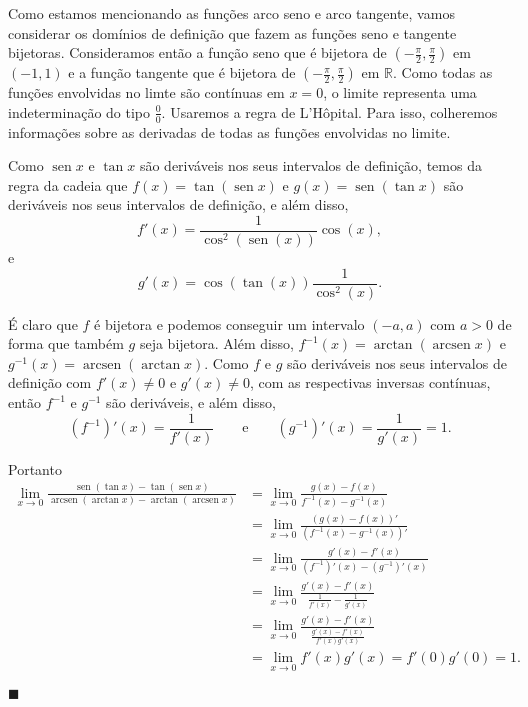 \documentclass[a4paper,11pt]{report}
\renewcommand{\baselinestretch}{1.3}   %
\DeclareMathOperator{\sen}{sen} %
\DeclareMathOperator{\arcsen}{arcsen}
\newenvironment{solucao}{ \vspace{.5\baselineskip} \renewcommand{\baselinestretch}{1}
                           \noindent {\bfseries Solução:} }
                        { \vspace{.5\baselineskip} \renewcommand{\baselinestretch}{1.2}
                           \hfill {\small $\blacksquare$} }
\begin{document}
\begin{solucao}
    Como estamos mencionando as funções arco seno e arco tangente, vamos considerar os domínios de
    definição que fazem as funções seno e tangente bijetoras. Consideramos então a função seno que
    é bijetora de $(-\frac{\pi}{2}, \frac{\pi}{2})$ em $(-1,1)$ e a função tangente que é bijetora
    de $(-\frac{\pi}{2}, \frac{\pi}{2})$ em $\mathbb{R}$. Como todas as funções envolvidas no
    limte são contínuas em $x = 0$, o limite representa uma indeterminação do tipo $\frac{0}{0}$.
    Usaremos a regra de L'Hôpital. Para isso, colheremos informações sobre as derivadas de todas
    as funções envolvidas no limite.

    Como $\sen x$ e $\tan x$ são deriváveis nos seus intervalos de definição, temos da regra da
    cadeia que $f(x) = \tan(\sen x)$ e $g(x) = \sen(\tan x)$ são deriváveis nos seus intervalos de
    definição, e além disso,
    $$ f'(x) = \frac{1}{\cos^{2}(\sen(x))} \cos(x), $$
    e
    $$ g'(x) = \cos(\tan(x)) \frac{1}{\cos^{2}(x)}. $$

    É claro que $f$ é bijetora e podemos conseguir um intervalo $(-a,a)$ com $a > 0$ de forma que
    também $g$ seja bijetora. Além disso, $f^{-1}(x) = \arctan(\arcsen x)$ e $g^{-1}(x) =
        \arcsen(\arctan x)$. Como $f$ e $g$ são deriváveis nos seus intervalos de definição com $f'(x)
        \neq 0$ e $g'(x) \neq 0$, com as respectivas inversas contínuas, então $f^{-1}$ e $g^{-1}$ são
    deriváveis, e além disso,
    $$ (f^{-1})'(x) = \frac{1}{f'(x)} \qquad \text{e} \qquad (g^{-1})'(x) = \frac{1}{g'(x)} = 1. $$

    Portanto
    \begin{align*}
        \lim_{x \to 0} \frac{\sen(\tan x) - \tan(\sen x)}{\arcsen(\arctan x) - \arctan(\arcsen x)}
         & = \lim_{x \to 0} \frac{g(x) - f(x)}{f^{-1}(x) - g^{-1}(x)}               \\
         & = \lim_{x \to 0} \frac{(g(x) - f(x))'}{(f^{-1}(x) - g^{-1}(x))'}         \\
         & = \lim_{x \to 0} \frac{g'(x) - f'(x)}{(f^{-1})'(x) - (g^{-1})'(x)}       \\
         & = \lim_{x \to 0} \frac{g'(x) - f'(x)}{\frac{1}{f'(x)} - \frac{1}{g'(x)}} \\
         & = \lim_{x \to 0} \frac{g'(x) - f'(x)}{\frac{g'(x) - f'(x)}{f'(x)g'(x)}}  \\
         & = \lim_{x \to 0} f'(x)g'(x) = f'(0) g'(0) = 1.
    \end{align*}


\end{solucao}
\end{document}
